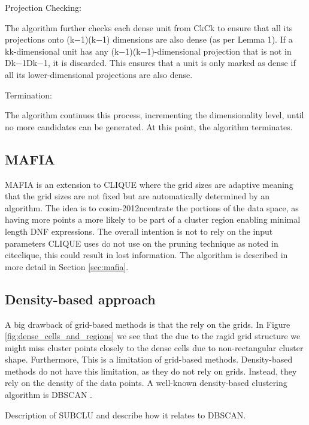 Projection Checking:

    The algorithm further checks each dense unit from CkCk​ to ensure that all its projections onto (k−1)(k−1) dimensions are also dense (as per Lemma 1). If a kk-dimensional unit has any (k−1)(k−1)-dimensional projection that is not in Dk−1Dk−1​, it is discarded.
    This ensures that a unit is only marked as dense if all its lower-dimensional projections are also dense.

Termination:

    The algorithm continues this process, incrementing the dimensionality level, until no more candidates can be generated. At this point, the algorithm terminates.

\subsection{MAFIA}
MAFIA is an extension to CLIQUE where the grid sizes are adaptive meaning that the grid sizes are not fixed but are automatically determined by an algorithm. The idea is to cosim-2012ncentrate the portions of the data space, as having more points a more likely to be part of a cluster region enabling minimal length DNF expressions. The overall intention is not to rely on the input parameters CLIQUE uses do not use on the pruning technique as noted in cite{clique}, this could result in lost information. The algorithm is described in more detail in Section \ref{sec:mafia}.

\subsection{Density-based approach}
A big drawback of grid-based methods is that the rely on the grids. In Figure \ref{fig:dense_cells_and_regions} we see that the due to the ragid grid structure we might miss cluster points closely to the dense cells due to non-rectangular cluster shape. Furthermore, This is a limitation of grid-based methods. Density-based methods do not have this limitation, as they do not rely on grids. Instead, they rely on the density of the data points. A well-known density-based clustering algorithm is DBSCAN \cite{dbscan}.


Description of SUBCLU and describe how it relates to DBSCAN.